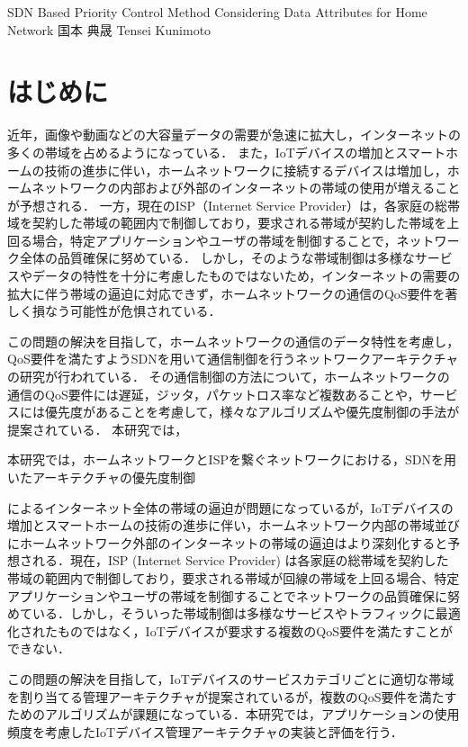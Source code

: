 \documentclass[a4paper,10pt,twocolumn,uplatex]{jsarticle}
\date{11}
\begin{document}
{SDN Based Priority Control Method Considering Data Attributes for Home Network}
{国本 典晟}
{Tensei Kunimoto}

\section{はじめに}
近年，画像や動画などの大容量データの需要が急速に拡大し，インターネットの多くの帯域を占めるようになっている．
また，IoTデバイスの増加とスマートホームの技術の進歩に伴い，ホームネットワークに接続するデバイスは増加し，ホームネットワークの内部および外部のインターネットの帯域の使用が増えることが予想される．
一方，現在のISP（Internet Service Provider）は，各家庭の総帯域を契約した帯域の範囲内で制御しており，要求される帯域が契約した帯域を上回る場合，特定アプリケーションやユーザの帯域を制御することで，ネットワーク全体の品質確保に努めている．
しかし，そのような帯域制御は多様なサービスやデータの特性を十分に考慮したものではないため，インターネットの需要の拡大に伴う帯域の逼迫に対応できず，ホームネットワークの通信のQoS要件を著しく損なう可能性が危惧されている．\par
この問題の解決を目指して，ホームネットワークの通信のデータ特性を考慮し，QoS要件を満たすようSDNを用いて通信制御を行うネットワークアーキテクチャの研究が行われている．
その通信制御の方法について，ホームネットワークの通信のQoS要件には遅延，ジッタ，パケットロス率など複数あることや，サービスには優先度があることを考慮して，様々なアルゴリズムや優先度制御の手法が提案されている．
本研究では，


本研究では，ホームネットワークとISPを繋ぐネットワークにおける，SDNを用いたアーキテクチャの優先度制御

によるインターネット全体の帯域の逼迫が問題になっているが，IoTデバイスの増加とスマートホームの技術の進歩に伴い，ホームネットワーク内部の帯域並びにホームネットワーク外部のインターネットの帯域の逼迫はより深刻化すると予想される．現在，ISP (Internet Service Provider) は各家庭の総帯域を契約した帯域の範囲内で制御しており，要求される帯域が回線の帯域を上回る場合、特定アプリケーションやユーザの帯域を制御することでネットワークの品質確保に努めている．しかし，そういった帯域制御は多様なサービスやトラフィックに最適化されたものではなく，IoTデバイスが要求する複数のQoS要件を満たすことができない．\par
この問題の解決を目指して，IoTデバイスのサービスカテゴリごとに適切な帯域を割り当てる管理アーキテクチャが提案されているが，複数のQoS要件を満たすためのアルゴリズムが課題になっている．本研究では，アプリケーションの使用頻度を考慮したIoTデバイス管理アーキテクチャの実装と評価を行う．\par
\end{document}

